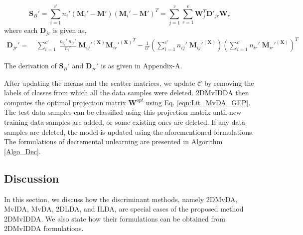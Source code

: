 \begin{equation}
\label{eqn:Sb_Dec}
\textbf{S}_B' = \sum\limits_{i=1}^{c'} n_{i}' (\textbf{M}_{i}' - \textbf{M}') (\textbf{M}_{i}' - \textbf{M}')^T = \sum\limits_{j=1}^{v} \sum\limits_{r=1}^{v} \textbf{W}_j^T \textbf{D}'_{jr} \textbf{W}_r
\end{equation}
where each $\textbf{D}_{jr}$ is given as,
\begin{equation}
\label{eqn:Djr_Dec}
\begin{split}
\textbf{D}_{jr}' = & \; \sum\limits_{i=1}^{c'} \; \frac{n_{ij}' \; n_{ir}'}{n_{i}'} \; {\textbf{M}_{ij}'}^{(\textbf{X})} {{\textbf{M}_{ir}'}^{(\textbf{X})}}^T - \frac{1}{n'} \left (\sum\limits_{i=1}^{c'} n_{ij}' \; {\textbf{M}_{ij}'}^{(\textbf{X})} \right ) \left (\sum\limits_{i=1}^{c'} n_{ir}' \; {{\textbf{M}_{ir}'}^{(\textbf{X})}} \right )^T
\end{split}
\end{equation}

The derivation of $\textbf{S}_{B}'$ and $\textbf{D}_{jr}'$ is as given in Appendix-A.%

After updating the means and the scatter matrices, we update $\mathcal{C}$ by removing the labels of classes from which all the data samples were deleted. 2DMvIDDA then computes the optimal projection matrix $\textbf{W}^{opt}$ using Eq. \ref{eqn:Lit_MvDA_GEP}. The test data samples can be classified using this projection matrix until new training data samples are added, or some existing ones are deleted. If any data samples are deleted, the model is updated using the aforementioned formulations. The formulations of decremental unlearning are presented in Algorithm \ref{Algo_Dec}.










\subsection{Discussion}
\label{subs:2DMvIDDA_Discussion}
In this section, we discuss how the discriminant methods, namely 2DMvDA, MvIDA, MvDA, 2DLDA, and ILDA, are special cases of the proposed method 2DMvIDDA. We also state how their formulations can be obtained from 2DMvIDDA formulations.



